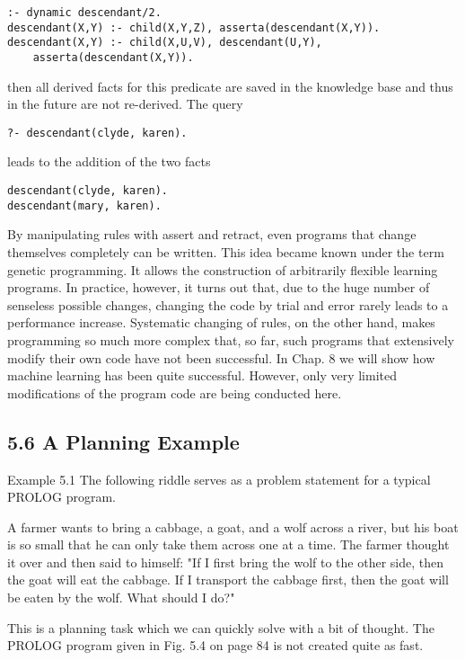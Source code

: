 \documentclass[10pt]{article}
\begin{document}
\begin{verbatim}
:- dynamic descendant/2.
descendant(X,Y) :- child(X,Y,Z), asserta(descendant(X,Y)).
descendant(X,Y) :- child(X,U,V), descendant(U,Y),
    asserta(descendant(X,Y)).
\end{verbatim}

then all derived facts for this predicate are saved in the knowledge base and thus in the future are not re-derived. The query

\begin{verbatim}
?- descendant(clyde, karen).
\end{verbatim}

leads to the addition of the two facts

\begin{verbatim}
descendant(clyde, karen).
descendant(mary, karen).
\end{verbatim}

By manipulating rules with assert and retract, even programs that change themselves completely can be written. This idea became known under the term genetic programming. It allows the construction of arbitrarily flexible learning programs. In practice, however, it turns out that, due to the huge number of senseless possible changes, changing the code by trial and error rarely leads to a performance increase. Systematic changing of rules, on the other hand, makes programming so much more complex that, so far, such programs that extensively modify their own code have not been successful. In Chap. 8 we will show how machine learning has been quite successful. However, only very limited modifications of the program code are being conducted here.

\subsection*{5.6 A Planning Example}
Example 5.1 The following riddle serves as a problem statement for a typical PROLOG program.

A farmer wants to bring a cabbage, a goat, and a wolf across a river, but his boat is so small that he can only take them across one at a time. The farmer thought it over and then said to himself: "If I first bring the wolf to the other side, then the goat will eat the cabbage. If I transport the cabbage first, then the goat will be eaten by the wolf. What should I do?"

This is a planning task which we can quickly solve with a bit of thought. The PROLOG program given in Fig. 5.4 on page 84 is not created quite as fast.
\end{document}
